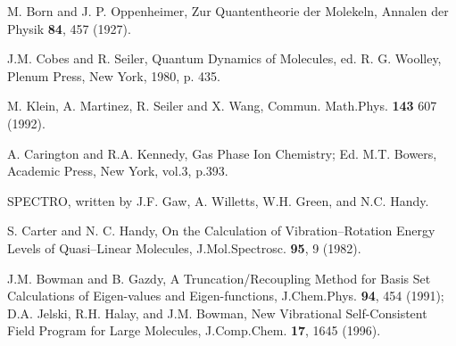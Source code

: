 \begin{thebibliography}{999}



 M. Born and J. P. Oppenheimer, 
Zur Quantentheorie der Molekeln,
Annalen der Physik 
{\bf 84}, 457 (1927).

 J.M. Cobes and R. Seiler, Quantum Dynamics of Molecules,
ed. R. G.  Woolley, Plenum Press, New York, 1980, p. 435.

 M. Klein, A. Martinez, R. Seiler and X. Wang, Commun.
Math.Phys. {\bf 143}  607 (1992).

A. Carington and R.A. Kennedy, Gas Phase Ion Chemistry;
Ed. M.T. Bowers, Academic Press, New York, vol.3, p.393.


SPECTRO, written by J.F. Gaw, A. Willetts, W.H. Green, and N.C. Handy.

S. Carter and N. C. Handy, 
On the Calculation of Vibration--Rotation Energy Levels of
Quasi--Linear Molecules,
J.Mol.Spectrosc. {\bf 95}, 9 (1982).

J.M. Bowman and B. Gazdy, 
A Truncation/Recoupling Method for Basis Set Calculations of
Eigen-values and Eigen-functions,
J.Chem.Phys.
{\bf 94}, 454 (1991);
D.A. Jelski, R.H. Halay, and J.M. Bowman,
New Vibrational Self-Consistent Field Program
for Large Molecules,
J.Comp.Chem. {\bf 17}, 1645 (1996).










\end{thebibliography}
